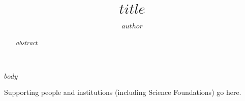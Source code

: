 \documentclass{mmeproc}
\begin{document}
\title{$title$}
\author{
  	$author$\null
  }
\begin{abstract} \fontsize{11pt}{13pt}\selectfont
  	$abstract$
\end{abstract}
\maketitle
\thispagestyle{empty}

$body$

\acknowledgements
Supporting people and institutions (including Science Foundations) go here.
\end{document}
